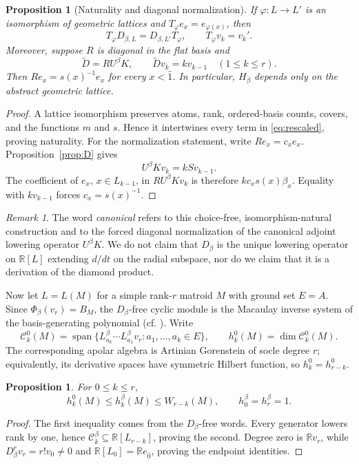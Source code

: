 \documentclass[11pt]{amsart}
\newtheorem{prop}[thm]{Proposition}
\theoremstyle{definition}
\theoremstyle{remark}
\newtheorem{remark}[thm]{Remark}
\newcommand{\R}{\mathbb{R}}
\newcommand{\cc}{\mathcal}
\DeclareMathOperator{\Span}{span}
\begin{document}
\begin{prop}[Naturality and diagonal normalization]\label{prop:naturality-2}
If $\varphi:L\to L'$ is an isomorphism of geometric lattices and
$T_\varphi e_x=e_{\varphi(x)}$, then
\[
T_\varphi D_{\beta,L}=D_{\beta,L'}T_\varphi,
\qquad
T_\varphi v_k=v_k'.
\]
Moreover, suppose $R$ is diagonal in the flat basis and
\[
\widetilde D=R U^\beta K,\qquad \widetilde Dv_k=kv_{k-1}\quad(1\le k\le r).
\]
Then $Re_x=s(x)^{-1}e_x$ for every $x<\hat1$. In particular, $H_\beta$ depends only on the abstract geometric lattice.
\end{prop}

\begin{proof}
A lattice isomorphism preserves atoms, rank, ordered-basis counts, covers, and the functions $m$ and $s$. Hence it intertwines every term in \eqref{eq:rescaled}, proving naturality. For the normalization statement, write $Re_x=c_xe_x$.  Proposition~\ref{prop:D} gives
\[
U^\beta Kv_k=kSv_{k-1}.
\]
The coefficient of $e_x$, $x\in L_{k-1}$, in $RU^\beta Kv_k$ is therefore
$k c_xs(x)\beta_x$.  Equality with $kv_{k-1}$ forces $c_x=s(x)^{-1}$.
\end{proof}

\begin{remark}\label{rem:canonical}
The word \emph{canonical} refers to this choice-free, isomorphism-natural construction and to the forced diagonal normalization of the canonical adjoint lowering operator $U^\beta K$.  We do not claim that $D_\beta$ is the unique lowering operator on $\R[L]$ extending $d/dt$ on the radial subspace, nor do we claim that it is a derivation of the diamond product.
\end{remark}

Now let $L=L(M)$ for a simple rank-$r$ matroid $M$ with ground set $E=A$.  Since $\Phi_\beta(v_r)=B_M$, the $D_\beta$-free cyclic module is the Macaulay inverse system of the basis-generating polynomial (cf. \cite{MaenoNumata}).  Write
\[
\cc C_k^0(M)=
\Span\{L_{a_k}^\beta\cdots L_{a_1}^\beta v_r:a_1,\ldots,a_k\in E\},
\qquad
h_k^0(M)=\dim\cc C_k^0(M).
\]
The corresponding apolar algebra is Artinian Gorenstein of socle degree $r$; equivalently, its derivative spaces have symmetric Hilbert function, so
$h_k^0=h_{r-k}^0$.

\begin{prop}\label{prop:bounds}
For $0\le k\le r$,
\[
h_k^0(M)\le h_k^\beta(M)\le W_{r-k}(M),
\qquad
h_0^\beta=h_r^\beta=1.
\]
\end{prop}

\begin{proof}
The first inequality comes from the $D_\beta$-free words. Every generator lowers rank by one, hence $\cc C_k^\beta\subseteq\R[L_{r-k}]$, proving the second. Degree zero is $\R v_r$, while $D_\beta^rv_r=r!v_0\ne0$ and $\R[L_0]=\R e_{\hat0}$, proving the endpoint identities. \qedhere
\end{proof}
\end{document}
